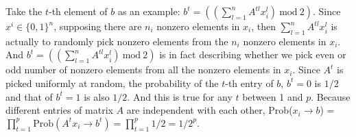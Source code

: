 \documentclass[twoside,11pt]{homework}
\begin{document}
Take the $t$-th element of $b$ as an example: $b^t =  ((\sum\limits_{l=1}^n A^{tl}x_i^l)\  \mathrm{mod}\  2)$.
Since $x^i \in \{0, 1\}^n$, supposing there are $n_i$ nonzero elements in $x_i$, then $\sum\limits_{l=1}^n A^{tl} x_i^l$ is actually to randomly pick nonzero elements from the $n_i$ nonzero elements in $x_i$.
And $b^t =  ((\sum\limits_{l=1}^n A^{tl} x_i^l)\ \mathrm{mod}\ 2)$ is in fact describing whether we pick even or odd number of nonzero elements from all the nonzero elements in $x_i$.
Since $A^t$ is picked uniformly at random, the probability of the $t$-th entry of $b$, $b^t =  0$ is $1/2$ and that of $b^t  = 1$ is also $1/2$.
And this is true for any $t$ between 1 and $p$. 
Because different entries of matrix $A$ are independent with each other, 
Prob($x_i \rightarrow b$) = $\prod\limits_{t=1}^p \mathrm{Prob}(A^t x_i\rightarrow b^t) = \prod\limits_{t=1}^p 1/2 = 1/2^p.$
\end{document}

